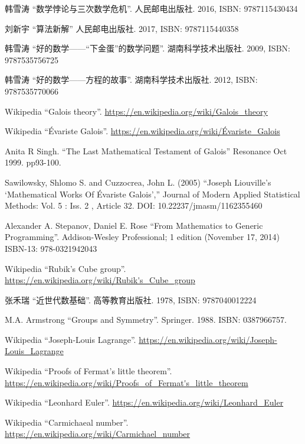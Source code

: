 \documentclass[b5paper]{article}
\begin{document}
\begin{thebibliography}{99}

韩雪涛 ``数学悖论与三次数学危机''. 人民邮电出版社. 2016, ISBN: 9787115430434

刘新宇 ``算法新解'' 人民邮电出版社. 2017, ISBN: 9787115440358

韩雪涛 ``好的数学——“下金蛋”的数学问题''. 湖南科学技术出版社. 2009, ISBN: 9787535756725

韩雪涛 ``好的数学——方程的故事''. 湖南科学技术出版社. 2012, ISBN: 9787535770066

Wikipedia ``Galois theory''. \url{https://en.wikipedia.org/wiki/Galois_theory}

Wikipedia ``Évariste Galois''. \url{https://en.wikipedia.org/wiki/Évariste_Galois}

Anita R Singh. ``The Last Mathematical Testament of Galois'' Resonance Oct 1999. pp93-100.

Sawilowsky, Shlomo S. and Cuzzocrea, John L. (2005) ``Joseph Liouville’s `Mathematical Works Of Évariste Galois','' Journal of Modern Applied Statistical Methods: Vol. 5 : Iss. 2 , Article 32. DOI: 10.22237/jmasm/1162355460

Alexander A. Stepanov, Daniel E. Rose ``From Mathematics to Generic Programming''. Addison-Wesley Professional; 1 edition (November 17, 2014) ISBN-13: 978-0321942043

Wikipedia ``Rubik's Cube group''. \url{https://en.wikipedia.org/wiki/Rubik's_Cube_group}

张禾瑞 ``近世代数基础''. 高等教育出版社. 1978, ISBN: 9787040012224

M.A. Armstrong ``Groups and Symmetry''. Springer. 1988. ISBN: 0387966757.

Wikipedia ``Joseph-Louis Lagrange''. \url{https://en.wikipedia.org/wiki/Joseph-Louis_Lagrange}

Wikipedia ``Proofs of Fermat's little theorem''. \url{https://en.wikipedia.org/wiki/Proofs_of_Fermat's_little_theorem}

Wikipedia ``Leonhard Euler''. \url{https://en.wikipedia.org/wiki/Leonhard_Euler}

Wikipedia ``Carmichaeal number''. \url{https://en.wikipedia.org/wiki/Carmichael_number}


\end{thebibliography}
\end{document}

